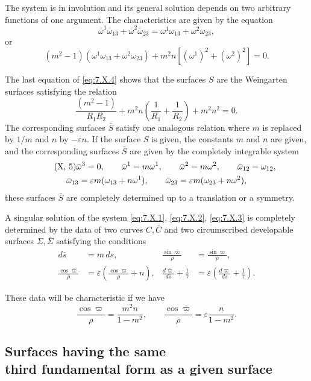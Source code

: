 \documentclass[leqno,11pt]{book}
\numberwithin{equation}{chapter}
\theoremstyle{shape1}
\theoremstyle{shape0}
\theoremstyle{shape2}
\theoremstyle{definition}
\begin{document}
The system is in involution and its general solution depends on two arbitrary functions of one argument. The characteristics are given by the equation
\[
\bar\omega^{1}\bar\omega_{13}+\bar\omega^{2}\bar\omega_{23}=\omega^{1}\omega_{13}+\omega^{2}\omega_{23},
\]
or
\[
(m^{2}-1)(\omega^{1}\omega_{13}+\omega^{2}\omega_{23})+m^{2}n[(\omega^{1})^{2}+(\omega^{2})^{2}]=0.
\]

The last equation of \eqref{eq:7.X.4} shows that the surfaces $S$ are the Weingarten surfaces satisfying the relation
\[
\frac{(m^{2}-1)}{R_{1}R_{2}}+m^{2}n\left(\frac{1}{R_{1}}+\frac{1}{R_{2}}\right)+m^{2}n^{2}=0.
\]
The corresponding surfaces $\bar S$ satisfy one analogous relation where $m$ is replaced by $1/m$ and $n$ by $-\varepsilon n$. If the surface $S$ is given, the constants $m$ and $n$ are given, and the corresponding surfaces $\bar S$ are given by the completely integrable system
\begin{gather}
  \label{eq:7.X.5}\tag{X, 5}
  \bar\omega{^3}=0,\qquad\bar\omega^{1}=m\omega^{1},\qquad\bar\omega^{2}=m\omega^{2},\qquad\bar\omega_{12}=\omega_{12},\\
  \bar\omega_{13}=\varepsilon m(\omega_{13}+n\omega^{1}),\qquad\bar\omega_{23}=\varepsilon m(\omega_{23}+n\omega^{2}),\notag
\end{gather}
these surfaces $\bar S$ are completely determined up to a translation or a symmetry.

A singular solution of the system \eqref{eq:7.X.1}, \eqref{eq:7.X.2}, \eqref{eq:7.X.3} is completely determined by the data of two curves $C,\bar C$ and two circumscribed developable surfaces $\Sigma,\bar\Sigma$ satisfying the conditions
\begin{align*}
d\bar s&=m\,ds,&\frac{\sin\bar\varpi}{\bar\rho}&=\frac{\sin\varpi}{\rho},\\
\frac{\cos\bar\varpi}{\bar\rho}&=\varepsilon\left(\frac{\cos\varpi}{\rho}+n\right),&\frac{d\bar\varpi}{d\bar s}+\frac{1}{\bar\tau}&=\varepsilon\left(\frac{d\varpi}{ds}+\frac{1}{\tau}\right).
\end{align*}

These data will be characteristic if we have
\[
\frac{\cos\varpi}{\rho}=\frac{m^{2}n}{1-m^{2}},\qquad\frac{\cos\bar\varpi}{\bar\rho}=\varepsilon\frac{n}{1-m^{2}}.
\]


\subsection[Surfaces having the same third fundamental form as a given surface]{Surfaces having the same \\third fundamental form as a given surface}
\label{sec:surfaces-having-same}
\end{document}
